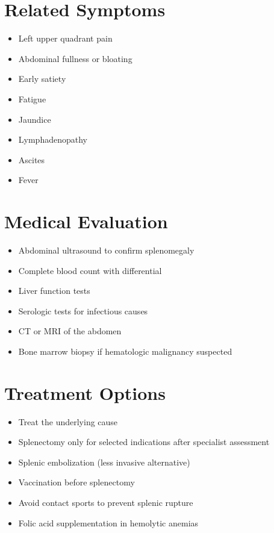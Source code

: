 \section*{Related Symptoms}
\begin{itemize}
\item Left upper quadrant pain
\item Abdominal fullness or bloating
\item Early satiety
\item Fatigue
\item Jaundice
\item Lymphadenopathy
\item Ascites
\item Fever
\end{itemize}

\section*{Medical Evaluation}
\begin{itemize}
\item Abdominal ultrasound to confirm splenomegaly
\item Complete blood count with differential
\item Liver function tests
\item Serologic tests for infectious causes
\item CT or MRI of the abdomen
\item Bone marrow biopsy if hematologic malignancy suspected
\end{itemize}

\section*{Treatment Options}
\begin{itemize}
\item Treat the underlying cause
\item Splenectomy only for selected indications after specialist assessment
\item Splenic embolization (less invasive alternative)
\item Vaccination before splenectomy
\item Avoid contact sports to prevent splenic rupture
\item Folic acid supplementation in hemolytic anemias
\end{itemize}


